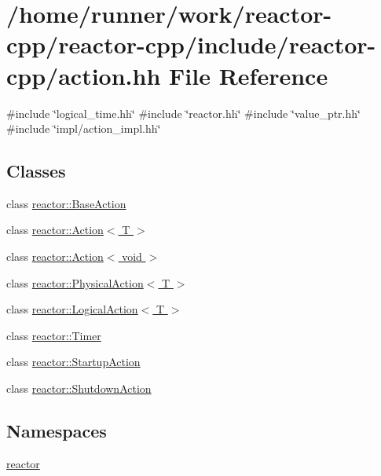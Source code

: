 \hypertarget{action_8hh}{}\section{/home/runner/work/reactor-\/cpp/reactor-\/cpp/include/reactor-\/cpp/action.hh File Reference}
\label{action_8hh}
{\ttfamily \#include \char`\"{}logical\+\_\+time.\+hh\char`\"{}}\newline
{\ttfamily \#include \char`\"{}reactor.\+hh\char`\"{}}\newline
{\ttfamily \#include \char`\"{}value\+\_\+ptr.\+hh\char`\"{}}\newline
{\ttfamily \#include \char`\"{}impl/action\+\_\+impl.\+hh\char`\"{}}\newline
\subsection*{Classes}
\begin{DoxyCompactItemize}
\item 
class \hyperlink{classreactor_1_1BaseAction}{reactor\+::\+Base\+Action}
\item 
class \hyperlink{classreactor_1_1Action}{reactor\+::\+Action$<$ T $>$}
\item 
class \hyperlink{classreactor_1_1Action_3_01void_01_4}{reactor\+::\+Action$<$ void $>$}
\item 
class \hyperlink{classreactor_1_1PhysicalAction}{reactor\+::\+Physical\+Action$<$ T $>$}
\item 
class \hyperlink{classreactor_1_1LogicalAction}{reactor\+::\+Logical\+Action$<$ T $>$}
\item 
class \hyperlink{classreactor_1_1Timer}{reactor\+::\+Timer}
\item 
class \hyperlink{classreactor_1_1StartupAction}{reactor\+::\+Startup\+Action}
\item 
class \hyperlink{classreactor_1_1ShutdownAction}{reactor\+::\+Shutdown\+Action}
\end{DoxyCompactItemize}
\subsection*{Namespaces}
\begin{DoxyCompactItemize}
\item 
 \hyperlink{namespacereactor}{reactor}
\end{DoxyCompactItemize}
